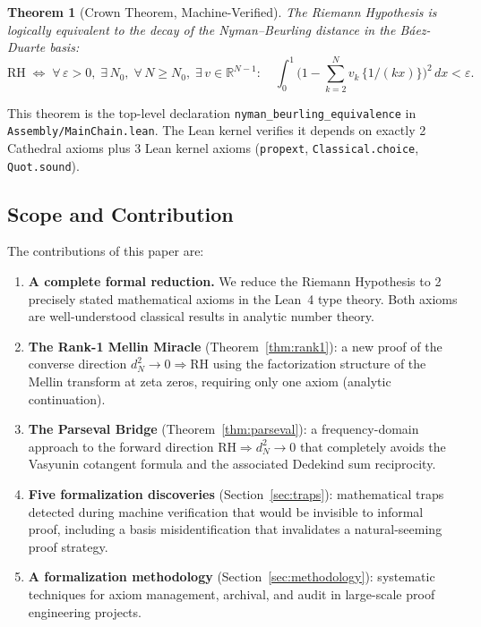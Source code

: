 \documentclass[11pt,a4paper]{article}
\theoremstyle{plain}
\newtheorem{theorem}{Theorem}[section]
\theoremstyle{definition}
\theoremstyle{remark}
\newcommand{\RH}{\mathrm{RH}}
\newcommand{\RR}{\mathbb{R}}
\newcommand{\fract}[1]{\{#1\}}
\newcommand{\lean}[1]{\texttt{#1}}
\begin{document}
\begin{theorem}[Crown Theorem, Machine-Verified]
\label{thm:crown}
The Riemann Hypothesis is logically equivalent to the decay of the
Nyman--Beurling distance in the B\'aez-Duarte basis:
\[
  \RH \;\iff\;
  \forall\,\varepsilon > 0,\;\exists\,N_0,\;\forall\,N \geq N_0,\;
  \exists\,v \in \RR^{N-1} :\quad
  \int_0^1 \biggl(1 - \sum_{k=2}^{N} v_k\,\fract{1/(kx)}\biggr)^2\,dx < \varepsilon.
\]
\end{theorem}

This theorem is the top-level declaration \lean{nyman\_beurling\_equivalence}
in \lean{Assembly/MainChain.lean}. The Lean kernel verifies it depends on
exactly 2 Cathedral axioms plus 3 Lean kernel axioms (\lean{propext},
\lean{Classical.choice}, \lean{Quot.sound}).

\subsection{Scope and Contribution}

The contributions of this paper are:

\begin{enumerate}
  \item \textbf{A complete formal reduction.} We reduce the Riemann
    Hypothesis to 2 precisely stated mathematical axioms in the Lean~4
    type theory. Both axioms are well-understood classical results in
    analytic number theory.

  \item \textbf{The Rank-1 Mellin Miracle} (Theorem~\ref{thm:rank1}):
    a new proof of the converse direction $d_N^2 \to 0 \Rightarrow \RH$
    using the factorization structure of the Mellin transform at zeta zeros,
    requiring only one axiom (analytic continuation).

  \item \textbf{The Parseval Bridge} (Theorem~\ref{thm:parseval}):
    a frequency-domain approach to the forward direction
    $\RH \Rightarrow d_N^2 \to 0$ that completely avoids the Vasyunin
    cotangent formula and the associated Dedekind sum reciprocity.

  \item \textbf{Five formalization discoveries} (Section~\ref{sec:traps}):
    mathematical traps detected during machine verification that would be
    invisible to informal proof, including a basis misidentification
    that invalidates a natural-seeming proof strategy.

  \item \textbf{A formalization methodology} (Section~\ref{sec:methodology}):
    systematic techniques for axiom management, archival, and audit
    in large-scale proof engineering projects.
\end{enumerate}
\end{document}
